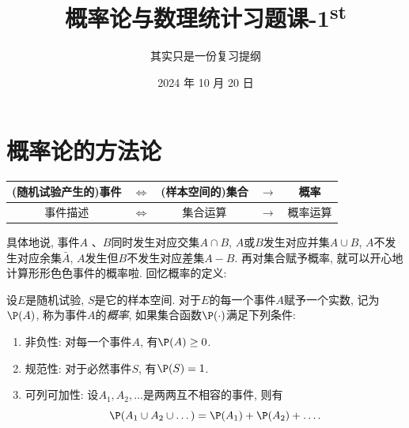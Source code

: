 \documentclass[11pt]{ctexart}
\title{概率论与数理统计习题课-1\textsuperscript{st}}
\author{其实只是一份复习提纲}
\date{2024 年 10 月 20 日}
\begin{document}
\maketitle
{ 	
	\footnotesize
	\keben
	\tableofcontents
}

\section{概率论的方法论}

\begin{table}[H]
	\centering
\begin{tabular}{ccccc}
	\toprule
		(随机试验产生的)事件 & $\Longleftrightarrow$ & (样本空间的)集合 & $\longrightarrow$ & 概率 \\
	\midrule
		事件描述 & $\Longleftrightarrow$ & 集合运算 & $\longrightarrow$ & 概率运算 \\
	\bottomrule
\end{tabular}
\end{table}

具体地说, 事件$A$ 、$B$同时发生对应交集$A \cap B$, $A$或$B$发生对应并集$A \cup B$, $A$不发生对应余集$\bar A$, $A$发生但$B$不发生对应差集$A - B$. 
再对集合赋予概率, 就可以开心地计算形形色色事件的概率啦. 
回忆概率的定义\cite{shengzhou:2020a}: 
\begin{definition}[概率]\label{def:prob}
	设$E$是随机试验, $S$是它的样本空间. 
	对于$E$的每一个事件$A$赋予一个实数, 记为$\P(A)$, 称为事件$A$的\emph{概率}, 如果集合函数$\P(\cdot)$满足下列条件: 
	\begin{enumerate}[label=(\arabic*)]
		\item {\keben 非负性:} 对每一个事件$A$, 有$\P(A) \geq 0$. 
		\item {\keben 规范性:} 对于必然事件$S$, 有$\P(S) = 1$. 
		\item {\keben 可列可加性:} 设$A_1, A_2, \dots$是两两互不相容的事件, 则有
			\begin{equation*}
				\P(A_1 \cup A_2 \cup \dots) = \P(A_1) + \P(A_2) + \dots. 
			\end{equation*}
	\end{enumerate}
\end{definition}
\end{document}
